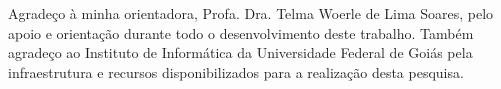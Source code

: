 \begin{agradecimentos}
Agradeço à minha orientadora, Profa. Dra. Telma Woerle de Lima Soares, pelo apoio e orientação durante todo o desenvolvimento deste trabalho. Também agradeço ao Instituto de Informática da Universidade Federal de Goiás pela infraestrutura e recursos disponibilizados para a realização desta pesquisa.
\end{agradecimentos}


